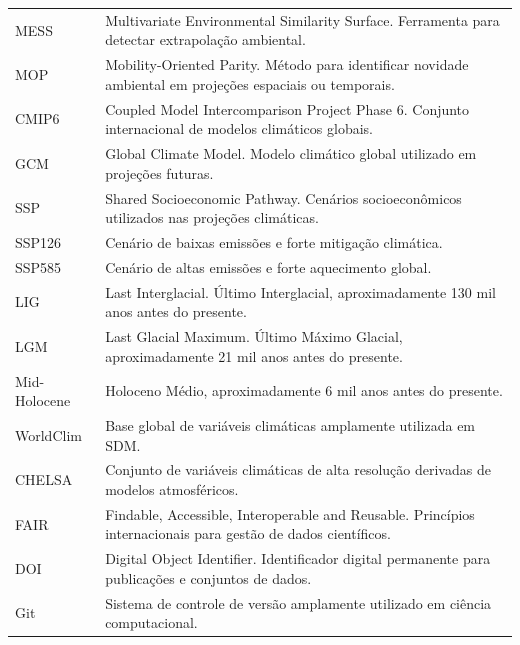 \documentclass{ueap-sdm}
\begin{document}
\begin{longtable}{
		p{}
		p{}
	}
	MESS &
	Multivariate Environmental Similarity Surface. Ferramenta para detectar extrapolação ambiental.
	\\
	
	MOP &
	Mobility-Oriented Parity. Método para identificar novidade ambiental em projeções espaciais ou temporais.
	\\
	
	CMIP6 &
	Coupled Model Intercomparison Project Phase 6. Conjunto internacional de modelos climáticos globais.
	\\
	
	GCM &
	Global Climate Model. Modelo climático global utilizado em projeções futuras.
	\\
	
	SSP &
	Shared Socioeconomic Pathway. Cenários socioeconômicos utilizados nas projeções climáticas.
	\\
	
	SSP126 &
	Cenário de baixas emissões e forte mitigação climática.
	\\
	
	SSP585 &
	Cenário de altas emissões e forte aquecimento global.
	\\
	
	LIG &
	Last Interglacial. Último Interglacial, aproximadamente 130 mil anos antes do presente.
	\\
	
	LGM &
	Last Glacial Maximum. Último Máximo Glacial, aproximadamente 21 mil anos antes do presente.
	\\
	
	Mid-Holocene &
	Holoceno Médio, aproximadamente 6 mil anos antes do presente.
	\\
	
	WorldClim &
	Base global de variáveis climáticas amplamente utilizada em SDM.
	\\
	
	CHELSA &
	Conjunto de variáveis climáticas de alta resolução derivadas de modelos atmosféricos.
	\\
	
	FAIR &
	Findable, Accessible, Interoperable and Reusable. Princípios internacionais para gestão de dados científicos.
	\\
	
	DOI &
	Digital Object Identifier. Identificador digital permanente para publicações e conjuntos de dados.
	\\
	
	Git &
	Sistema de controle de versão amplamente utilizado em ciência computacional.
	\\
	

\end{longtable}
\end{document}
